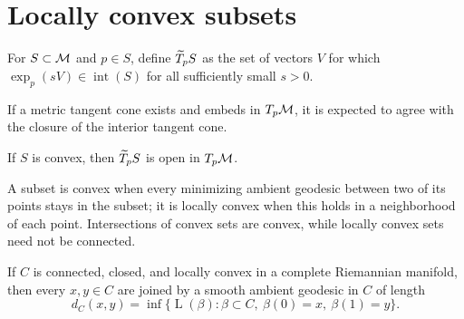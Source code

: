 \section{Locally convex subsets}

\begin{definition}
\label{def:chow-iii-h11-interior-tangent-cone}
For $S\subset\mathcal M$ and $p\in S$, define $\widetilde T_pS$ as the set of vectors $V$ for which
$\exp_p(sV)\in\operatorname{int}(S)$ for all sufficiently small $s>0$.
\end{definition}

\begin{remark}
\label{rem:chow-iii-h12-tangent-cone-realization}
If a metric tangent cone exists and embeds in $T_p\mathcal M$, it is expected to agree with
the closure of the interior tangent cone.
\end{remark}

\begin{lemma}
\label{lem:chow-iii-h13-tangent-cone-open}
If $S$ is convex, then $\widetilde T_pS$ is open in $T_p\mathcal M$.
\end{lemma}

\begin{remark}
\label{rem:chow-iii-h14-convexity-variants}
A subset is convex when every minimizing ambient geodesic between two of its points
stays in the subset; it is locally convex when this holds in a neighborhood of each
point.  Intersections of convex sets are convex, while locally convex sets need not
be connected.
\end{remark}

\begin{lemma}
\label{lem:chow-iii-h15-minimal-geodesics-locally-convex}
If $C$ is connected, closed, and locally convex in a complete Riemannian manifold,
then every $x,y\in C$ are joined by a smooth ambient geodesic in $C$ of length
\[
d_C(x,y)=\inf\{\operatorname{L}(\beta):\beta\subset C,\ \beta(0)=x,\ \beta(1)=y\}.
\]
\end{lemma}

